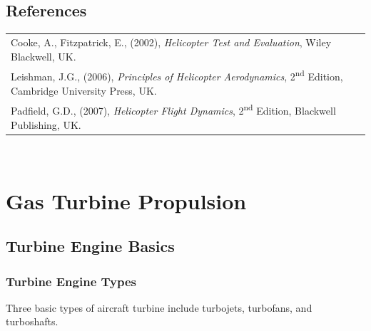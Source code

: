 \documentclass[
]{book}
\begin{document}
\hypertarget{references}{%
\section{References}\label{references}}

\begin{longtable}[]{@{}l@{}}
\toprule
\endhead
\begin{minipage}[t]{0.97\columnwidth}\raggedright
Cooke, A., Fitzpatrick, E., (2002), \emph{Helicopter Test and Evaluation}, Wiley Blackwell, UK.\strut
\end{minipage}\tabularnewline
\begin{minipage}[t]{0.97\columnwidth}\raggedright
Leishman, J.G., (2006), \emph{Principles of Helicopter Aerodynamics}, 2\textsuperscript{nd} Edition, Cambridge University Press, UK.\strut
\end{minipage}\tabularnewline
\begin{minipage}[t]{0.97\columnwidth}\raggedright
Padfield, G.D., (2007), \emph{Helicopter Flight Dynamics}, 2\textsuperscript{nd} Edition, Blackwell Publishing, UK.\strut
\end{minipage}\tabularnewline
\bottomrule
\end{longtable}

~

\hypertarget{gas-turbine-propulsion}{%
\chapter{Gas Turbine Propulsion}\label{gas-turbine-propulsion}}

\hypertarget{turbine-engine-basics}{%
\section{Turbine Engine Basics}\label{turbine-engine-basics}}

\hypertarget{turbine-engine-types}{%
\subsection{Turbine Engine Types}\label{turbine-engine-types}}

Three basic types of aircraft turbine include turbojets, turbofans, and
turboshafts.
\end{document}
